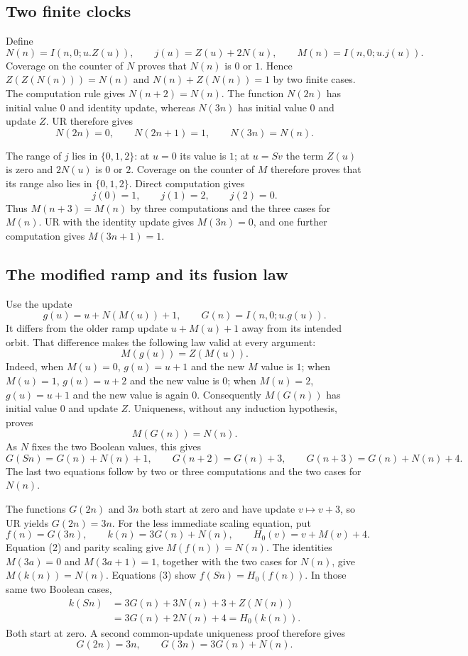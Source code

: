 \documentclass[11pt]{article}
\theoremstyle{definition}\newtheorem{definition}[theorem]{Definition}
\begin{document}
\subsection{Two finite clocks}
Define
\[
 N(n)=I(n,0;u.Z(u)),\qquad j(u)=Z(u)+2N(u),\qquad
 M(n)=I(n,0;u.j(u)).
\]
Coverage on the counter of $N$ proves that $N(n)$ is $0$ or $1$.
Hence $Z(Z(N(n)))=N(n)$ and $N(n)+Z(N(n))=1$ by two finite cases.
The computation rule gives $N(n+2)=N(n)$.
The function $N(2n)$ has initial value $0$ and identity update, whereas
$N(3n)$ has initial value $0$ and update $Z$.  UR therefore gives
\[
 N(2n)=0,\qquad N(2n+1)=1,\qquad N(3n)=N(n).
\]

The range of $j$ lies in $\{0,1,2\}$: at $u=0$ its value is $1$;
at $u=Sv$ the term $Z(u)$ is zero and $2N(u)$ is $0$ or $2$.
Coverage on the counter of $M$ therefore proves that its range also lies
in $\{0,1,2\}$.  Direct computation gives
\[
 j(0)=1,\qquad j(1)=2,\qquad j(2)=0.
\]
Thus $M(n+3)=M(n)$ by three computations and the three cases for
$M(n)$.  UR with the identity update gives $M(3n)=0$, and one further
computation gives $M(3n+1)=1$.

\subsection{The modified ramp and its fusion law}
Use the update
\[
 g(u)=u+N(M(u))+1,\qquad G(n)=I(n,0;u.g(u)).
\]
It differs from the older ramp update $u+M(u)+1$ away from its intended
orbit.  That difference makes the following law valid at every argument:
\[
                         M(g(u))=Z(M(u)).                 \tag{1}
\]
Indeed, when $M(u)=0$, $g(u)=u+1$ and the new $M$ value is $1$;
when $M(u)=1$, $g(u)=u+2$ and the new value is $0$; when $M(u)=2$,
$g(u)=u+1$ and the new value is again $0$.
Consequently $M(G(n))$ has initial value $0$ and update $Z$.
Uniqueness, without any induction hypothesis, proves
\[
                             M(G(n))=N(n).                \tag{2}
\]
As $N$ fixes the two Boolean values, this gives
\[
 G(Sn)=G(n)+N(n)+1,\qquad G(n+2)=G(n)+3,
 \qquad G(n+3)=G(n)+N(n)+4.                               \tag{3}
\]
The last two equations follow by two or three computations and the
two cases for $N(n)$.

The functions $G(2n)$ and $3n$ both start at zero and have update
$v\mapsto v+3$, so UR yields $G(2n)=3n$.
For the less immediate scaling equation, put
\[
 f(n)=G(3n),\qquad k(n)=3G(n)+N(n),\qquad H_0(v)=v+M(v)+4.
\]
Equation (2) and parity scaling give $M(f(n))=N(n)$.
The identities $M(3a)=0$ and $M(3a+1)=1$, together with the two cases
for $N(n)$, give $M(k(n))=N(n)$.
Equations (3) show $f(Sn)=H_0(f(n))$.  In those same two Boolean cases,
\[
 \begin{split}
 k(Sn)&=3G(n)+3N(n)+3+Z(N(n))\\
      &=3G(n)+2N(n)+4=H_0(k(n)).
 \end{split}
\]
Both start at zero.  A second common-update uniqueness proof therefore
gives
\[
                  G(2n)=3n,\qquad G(3n)=3G(n)+N(n).       \tag{4}
\]
\end{document}
